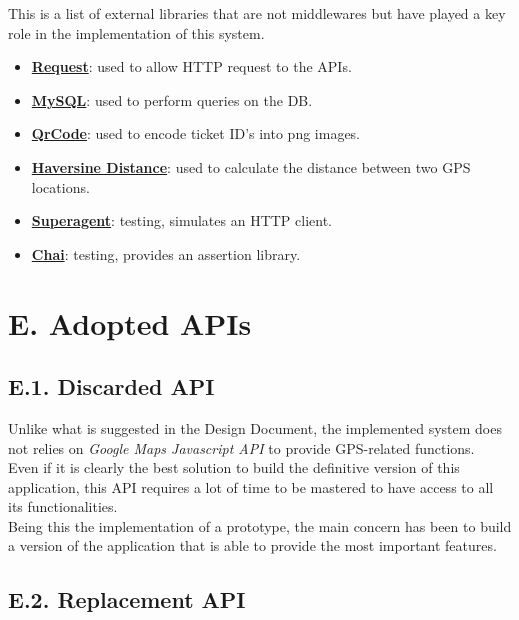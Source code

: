 This is a list of external libraries that are not middlewares but have played a key role in the implementation of this system.
\begin{itemize}
  \item \textbf{\href{https://www.npmjs.com/package/request}{Request}}: used to allow HTTP request to the APIs.
  \item \textbf{\href{https://www.npmjs.com/package/mysql}{MySQL}}: used to perform queries on the DB.
  \item \textbf{\href{https://www.npmjs.com/package/qrcode}{QrCode}}: used to encode ticket ID's into png images.
  \item \textbf{\href{https://www.npmjs.com/package/haversine-distance}{Haversine Distance}}: used to calculate the distance between two GPS locations.
  \item \textbf{\href{https://www.npmjs.com/package/superagent}{Superagent}}: testing, simulates an HTTP client.
  \item \textbf{\href{https://www.npmjs.com/package/chai}{Chai}}: testing, provides an assertion library.
\end{itemize}

\section{E. Adopted APIs}

\subsection{E.1. Discarded API}

Unlike what is suggested in the Design Document, the implemented system does not relies on \emph{Google Maps Javascript API} to provide GPS-related functions.\\
Even if it is clearly the best solution to build the definitive version of this application, this API requires a lot of time to be mastered to have access to all its functionalities.\\
Being this the implementation of a prototype, the main concern has been to build a version of the application that is able to provide the most important features.

\subsection{E.2. Replacement API}

